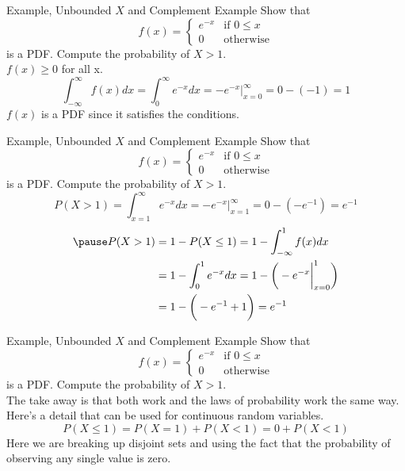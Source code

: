 \documentclass[handout]{beamer}
\newcommand{\nl}[1]{\vspace{#1 em}}
\begin{document}
    \begin{frame}{Example, Unbounded $X$ and Complement Example}
        Show that 
        $$f(x)=\begin{cases} e^{-x} & \text{if }0\leq x \\
        0 & \text{otherwise}\end{cases} $$
        is a PDF. Compute the probability of $X>1$.\\ \nl{0.5}
        \pause $f(x)\geq 0$ for all x.
        \pause $$ \int_{-\infty}^\infty f(x) dx = \int_{0}^\infty e^{-x} dx = -e^{-x}\bigg|_{x=0}^\infty = 0 - (-1) = 1 $$
        \pause $f(x)$ is a PDF since it satisfies the conditions.
    \end{frame}
    \begin{frame}{Example, Unbounded $X$ and Complement Example}
        Show that 
        $$f(x)=\begin{cases} e^{-x} & \text{if }0\leq x \\
        0 & \text{otherwise}\end{cases} $$
        is a PDF. Compute the probability of $X>1$.\\ \nl{0.5}
        \pause 
        $$ P(X>1) = \int_{x=1}^\infty e^{-x} dx = -e^{-x}\bigg|_{x=1}^\infty = 0 - (-e^{-1}) = e^{-1} $$
        \begin{align*}
            \pause
        P(X>1) &= 1- P(X\leq 1) = 1 - \int_{-\infty}^{1} f(x) dx \\
        & = 1 - \int_{0}^{1} e^{-x} dx =  1 - \bigg( -e^{-x} \bigg|_{x=0}^1\bigg)\\
        & = 1 - \bigg( -e^{-1} +1 \bigg) = e^{-1}
        \end{align*}
    \end{frame}
    \begin{frame}{Example, Unbounded $X$ and Complement Example}
        Show that 
        $$f(x)=\begin{cases} e^{-x} & \text{if }0\leq x \\
        0 & \text{otherwise}\end{cases} $$
        is a PDF. Compute the probability of $X>1$.\\ \nl{0.5}
        The take away is that both work and the laws of probability work the same way.
        \\ \nl{0.5}
        Here's a detail that can be used for continuous random variables.
        $$ P(X\leq 1) = P(X=1) + P(X<1) = 0 + P(X<1) $$
        Here we are breaking up disjoint sets and using the fact that the probability of observing any single value is zero.
    \end{frame}
\end{document}
